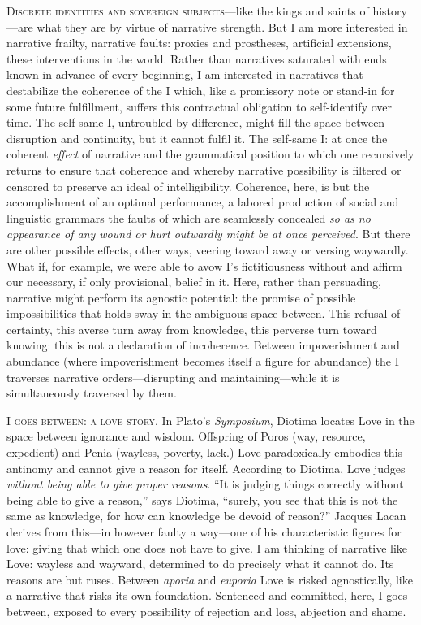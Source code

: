 \documentclass[
]{memoir}
\begin{document}
\textsc{Discrete identities and sovereign subjects}---like the kings and
saints of history---are what they are by virtue of narrative strength.
But I am more interested in narrative frailty, narrative faults: proxies
and prostheses, artificial extensions, these interventions in the world.
Rather than narratives saturated with ends known in advance of every
beginning, I am interested in narratives that destabilize the coherence
of the I which, like a promissory note or stand-in for some future
fulfillment, suffers this contractual obligation to self-identify over
time. The self-same I, untroubled by difference, might fill the space
between disruption and continuity, but it cannot fulfil it. The
self-same I: at once the coherent \emph{effect} of narrative and the
grammatical position to which one recursively returns to ensure that
coherence and whereby narrative possibility is filtered or censored to
preserve an ideal of intelligibility. Coherence, here, is but the
accomplishment of an optimal performance, a labored production of social
and linguistic grammars the faults of which are seamlessly concealed
\emph{so as no appearance of any wound or hurt outwardly might be at
once perceived}. But there are other possible effects, other ways,
veering toward away or versing waywardly. What if, for example, we were
able to avow I's fictitiousness without and affirm our necessary, if
only provisional, belief in it. Here, rather than persuading, narrative
might perform its agnostic potential: the promise of possible
impossibilities that holds sway in the ambiguous space between. This
refusal of certainty, this averse turn away from knowledge, this
perverse turn toward knowing: this is not a declaration of incoherence.
Between impoverishment and abundance (where impoverishment becomes
itself a figure for abundance) the I traverses narrative
orders---disrupting and maintaining---while it is simultaneously
traversed by them.

\textsc{I goes between: a love story.} In Plato's \emph{Symposium},
Diotima locates Love in the space between ignorance and wisdom.
Offspring of Poros (way, resource, expedient) and Penia (wayless,
poverty, lack.) Love paradoxically embodies this antinomy and cannot
give a reason for itself. According to Diotima, Love judges
\emph{without being able to give proper reasons}. ``It is judging things
correctly without being able to give a reason,'' says Diotima, ``surely,
you see that this is not the same as knowledge, for how can knowledge be
devoid of reason?'' Jacques Lacan derives from this---in however faulty
a way---one of his characteristic figures for love: giving that which
one does not have to give. I am thinking of narrative like Love: wayless
and wayward, determined to do precisely what it cannot do. Its reasons
are but ruses. Between \emph{aporia} and \emph{euporia} Love is risked
agnostically, like a narrative that risks its own foundation. Sentenced
and committed, here, I goes between, exposed to every possibility of
rejection and loss, abjection and shame.
\end{document}
